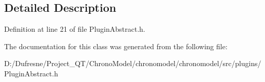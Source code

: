 \subsection{Detailed Description}


Definition at line 21 of file Plugin\-Abstract.\-h.



The documentation for this class was generated from the following file\-:\begin{DoxyCompactItemize}
\item 
D\-:/\-Dufresne/\-Project\-\_\-\-Q\-T/\-Chrono\-Model/chronomodel/chronomodel/src/plugins/Plugin\-Abstract.\-h\end{DoxyCompactItemize}
